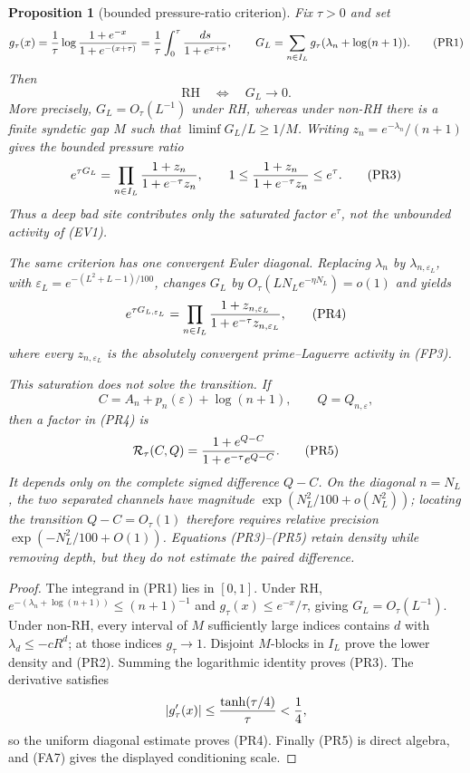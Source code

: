 \documentclass[11pt]{amsart}
\newtheorem{proposition}[theorem]{Proposition}
\theoremstyle{definition}
\theoremstyle{remark}
\theoremstyle{definition}
\newcommand{\RH}{\mathrm{RH}}
\begin{document}
\begin{proposition}[bounded pressure-ratio criterion]
\label{prop:li-bounded-pressure-ratio}
Fix $\tau>0$ and set
\[
 g_\tau(x)={1\over\tau}\log{1+e^{-x}\over1+e^{-(x+\tau)}}
 ={1\over\tau}\int_0^\tau{ds\over1+e^{x+s}},\qquad
 G_L=\sum_{n\in I_L}g_\tau(\lambda_n+\log(n+1)).          \tag{PR1}
\]
Then
\[
 \boxed{\quad\RH\quad\Longleftrightarrow\quad G_L\to0.\quad} \tag{PR2}
\]
More precisely, $G_L=O_\tau(L^{-1})$ under RH, whereas under non-RH
there is a finite syndetic gap $M$ such that
$\liminf G_L/L\ge1/M$.
Writing $z_n=e^{-\lambda_n}/(n+1)$ gives the bounded pressure ratio
\[
 e^{\tau G_L}
 =\prod_{n\in I_L}{1+z_n\over1+e^{-\tau}z_n},
 \qquad 1\le{1+z_n\over1+e^{-\tau}z_n}\le e^\tau.         \tag{PR3}
\]
Thus a deep bad site contributes only the saturated factor $e^\tau$, not
the unbounded activity of (EV1).

The same criterion has one convergent Euler diagonal.  Replacing
$\lambda_n$ by $\lambda_{n,\varepsilon_L}$, with
$\varepsilon_L=e^{-(L^2+L-1)/100}$, changes $G_L$ by
$O_\tau(LN_Le^{-\eta N_L})=o(1)$ and yields
\[
 e^{\tau G_{L,\varepsilon_L}}
 =\prod_{n\in I_L}
 {1+z_{n,\varepsilon_L}\over
  1+e^{-\tau}z_{n,\varepsilon_L}},                       \tag{PR4}
\]
where every $z_{n,\varepsilon_L}$ is the absolutely convergent
prime--Laguerre activity in (FP3).

This saturation does not solve the transition.  If
\[
 C=A_n+p_n(\varepsilon)+\log(n+1),\qquad Q=Q_{n,\varepsilon},
\]
then a factor in (PR4) is
\[
 \mathcal R_\tau(C,Q)
 ={1+e^{Q-C}\over1+e^{-\tau}e^{Q-C}}.                    \tag{PR5}
\]
It depends only on the complete signed difference $Q-C$.  On the diagonal
$n=N_L$, the two separated channels have magnitude
$\exp(N_L^2/100+o(N_L^2))$; locating the transition $Q-C=O_\tau(1)$
therefore requires relative precision
$\exp(-N_L^2/100+O(1))$.  Equations (PR3)--(PR5) retain density while
removing depth, but they do not estimate the paired difference.
\end{proposition}

\begin{proof}
The integrand in (PR1) lies in $[0,1]$.  Under RH,
$e^{-(\lambda_n+\log(n+1))}\le(n+1)^{-1}$ and
$g_\tau(x)\le e^{-x}/\tau$, giving $G_L=O_\tau(L^{-1})$.
Under non-RH, every interval of $M$ sufficiently large indices contains
$d$ with $\lambda_d\le-cR^d$; at those indices $g_\tau\to1$.  Disjoint
$M$-blocks in $I_L$ prove the lower density and (PR2).
Summing the logarithmic identity proves (PR3).  The derivative satisfies
\[
 |g_\tau'(x)|\le{\tanh(\tau/4)\over\tau}<\frac14,
\]
so the uniform diagonal estimate proves (PR4).  Finally (PR5) is direct
algebra, and (FA7) gives the displayed conditioning scale.
\end{proof}
\end{document}
